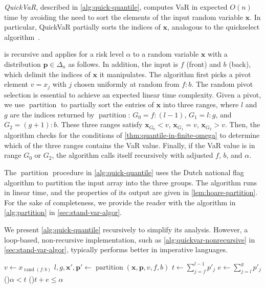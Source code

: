 \emph{QuickVaR}, described in \cref{alg:quick-quantile}, computes VaR in expected $O(n)$ time by avoiding the need to sort the elements of the input random variable $\bm{x}$. In particular, QuickVaR partially sorts the indices of $\bm{x}$, analogous to the quickselect algorithm~\cite{horowitz1998computer}. 

 is recursive and applies for a risk level $\alpha$ to a random variable $\bm{x}$ with a distribution $\bm{p}\in \Delta_n$ as follows. In addition, the input is $f$ (front) and $b$ (back), which delimit the indices of $\bm{x}$ it manipulates. The algorithm first picks a pivot element $v = x_j$ with $j$ chosen uniformly at random from $f{:}b$. The random pivot selection is essential to achieve an expected linear time complexity. Given a pivot, we use $\operatorname{partition}$ to partially sort the entries of $\bm{x}$ into three ranges, where $l$ and $g$ are the indices returned by $\operatorname{partition}$: $G_0 = f{:}(l-1)$, $G_1 = l{:}g$, and $G_2 = (g+1){:}b$. These three ranges satisfy $\bm{x}_{G_0} < v$, $\bm{x}_{G_1} = v$, $\bm{x}_{G_2} > v$. Then, the algorithm checks for the conditions of \cref{thm:quantile-in-finite-omega} to determine which of the three ranges contains the VaR value. Finally, if the VaR value is in range $G_0$ or $G_2$, the algorithm calls itself recursively with adjusted $f$, $b$, and $\alpha$.

The $\operatorname{partition}$ procedure in \cref{alg:quick-quantile} uses the Dutch national flag algorithm to partition the input array into the three groups. The algorithm runs in linear time, and the properties of its output are given in \cref{lem:hoare-partition}. For the sake of completeness, we provide the reader with the algorithm in \cref{alg:partition} in \cref{sec:stand-var-algor}. 

We present \cref{alg:quick-quantile} recursively to simplify its analysis. However, a loop-based, non-recursive implementation, such as \cref{alg:quickvar-nonrecursive} in \cref{sec:stand-var-algor}, typically performs better in imperative languages. 

\begin{algorithm}
  \caption{\texttt{QuickVaR}: Recursive VaR algorithm (when $f=1, b=n$)} \label{alg:quick-quantile}
  \Input{$\bm{x} \in \Real^n$, $\bm{p} \in \Delta_n$, $\alpha \in [0,1)$, $f, b \in 1{:}n$ such that $f \le  b$ and $\sum_{j=f}^b p_j > \alpha$}
  \Output{$\varo_{\alpha}[\tilde{x}]$}
  $v \gets x_{\operatorname{rand}(f{:}b)}$ 
  $l, g, \bm{x}', \bm{p}' \gets \operatorname{partition}(\bm{x}, \bm{p}, v, f, b)$
  \label{ln:t}
  $t \gets \sum_{j=f}^{l-1} p'_j$ 
  \label{ln:e}
  $e \gets \sum_{j=l}^{g} p'_j$  
  \label{ln:firstif}
  \If(){$\alpha < t$}{ 
  }
  \label{ln:secondif}
  \ElseIf(){$t + e \le \alpha$}{
  }
  \label{ln:thirdif}
\end{algorithm}


